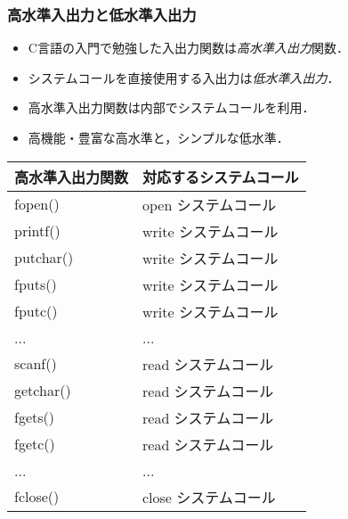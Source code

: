 \documentclass{beamer}                 %
\begin{document}
\begin{frame}
  \frametitle{高水準入出力と低水準入出力}
\begin{itemize}
\item C言語の入門で勉強した入出力関数は\emph{高水準入出力}関数．
\item システムコールを直接使用する入出力は\emph{低水準入出力}．
\item 高水準入出力関数は内部でシステムコールを利用．
\item 高機能・豊富な高水準と，シンプルな低水準．
\end{itemize}

\begin{center}
{\footnotesize\ttfamily\begin{tabular}{l | l}\hline\hline
高水準入出力関数 & 対応するシステムコール \\\hline
fopen()      & open システムコール \\
printf()     & write システムコール \\
putchar()    & write システムコール \\
fputs()      & write システムコール \\
fputc()      & write システムコール \\
...          & ...                     \\
scanf()      & read システムコール \\
getchar()    & read システムコール \\
fgets()      & read システムコール \\
fgetc()      & read システムコール \\
...          & ...                      \\
fclose()     & close システムコール \\
\end{tabular}}
\end{center}

\end{frame}
\end{document}
